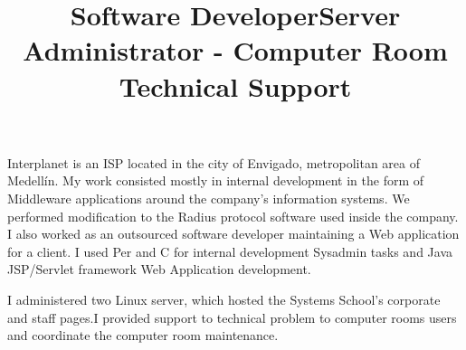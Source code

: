 \begin{resume}
\title{\textbf{Software Developer}}
\begin{position}
Interplanet is an  ISP located in the city of Envigado, metropolitan area of Medell\'{i}n.
My work consisted mostly  in internal development in the form of
Middleware applications  around the company's information systems.
We performed modification to the Radius protocol software used inside the company.
I also worked as an outsourced software developer maintaining a Web application
for a client.  I used Per and C for internal development Sysadmin
tasks and  Java JSP/Servlet framework Web Application development.
\end{position}
\newline
\newline
\newline

\title{\textbf{Server Administrator - Computer Room Technical Support}}
\begin{position}
I administered two Linux server, which hosted the Systems School's
corporate and staff pages.I provided support to technical problem 
to computer rooms users and coordinate the computer room maintenance.
\end{position}
\newline








\end{resume}
